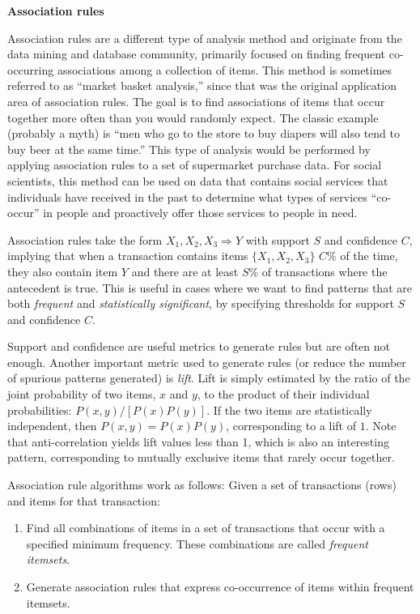 \documentclass[]{krantz}
\begin{document}
\textbf{Association rules}

Association rules are a different type of analysis method and originate
from the data mining and database community, primarily focused on
finding frequent co-occurring associations among a collection of items.
This method is sometimes referred to as ``market basket analysis,''
since that was the original application area of association rules. The
goal is to find associations of items that occur together more often
than you would randomly expect. The classic example (probably a myth) is
``men who go to the store to buy diapers will also tend to buy beer at
the same time.'' This type of analysis would be performed by applying
association rules to a set of supermarket purchase data. For social
scientists, this method can be used on data that contains social
services that individuals have received in the past to determine what
types of services ``co-occur'' in people and proactively offer those
services to people in need.

Association rules take the form \(X_1, X_2, X_3 \Rightarrow Y\) with
support \(S\) and confidence \(C\), implying that when a transaction
contains items \(\{X_1, X_2, X_3\}\) \(C\)\% of the time, they also
contain item \(Y\) and there are at least \(S\)\% of transactions where
the antecedent is true. This is useful in cases where we want to find
patterns that are both \emph{frequent} and \emph{statistically
significant}, by specifying thresholds for support \(S\) and confidence
\(C\).

Support and confidence are useful metrics to generate rules but are
often not enough. Another important metric used to generate rules (or
reduce the number of spurious patterns generated) is \emph{lift}. Lift
is simply estimated by the ratio of the joint probability of two items,
\(x\) and \(y\), to the product of their individual probabilities:
\(P(x,y)/[P(x)P(y)]\). If the two items are statistically independent,
then \(P(x,y)=P(x)P(y)\), corresponding to a lift of \(1\). Note that
anti-correlation yields lift values less than 1, which is also an
interesting pattern, corresponding to mutually exclusive items that
rarely occur together.

Association rule algorithms work as follows: Given a set of transactions
(rows) and items for that transaction:

\begin{enumerate}
\def\labelenumi{\arabic{enumi}.}
\item
  Find all combinations of items in a set of transactions that occur
  with a specified minimum frequency. These combinations are called
  \emph{frequent itemsets}.
\item
  Generate association rules that express co-occurrence of items within
  frequent itemsets.
\end{enumerate}
\end{document}
